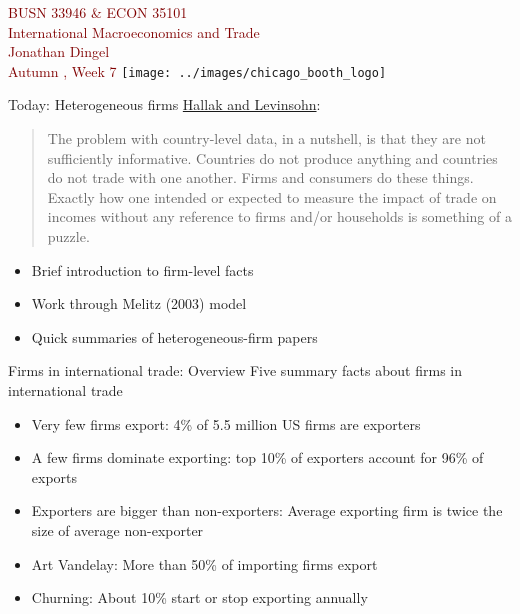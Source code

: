 \documentclass[10pt,notes=hide]{beamer}
\begin{document}
\begin{frame}[plain]
\begin{center}
\large
\textcolor{maroon}{BUSN 33946 \& ECON 35101\\
International Macroeconomics and Trade\\ 
Jonathan Dingel\\
Autumn \the\year, Week 7}
\vfill 
\texttt{[image: ../images/chicago\_booth\_logo]}
\end{center}
\end{frame}
\begin{frame}{Today: Heterogeneous firms}
\href{http://fordschool.umich.edu/rsie/workingpapers/Papers501-525/r509.pdf}{Hallak and Levinsohn}:
\begin{quote}
The problem with country-level data, in a nutshell, is that they are not sufficiently informative.
Countries do not produce anything and countries do not trade with one another.
Firms and consumers do these things.
Exactly how one intended or expected to measure the impact of trade on incomes without any reference to firms and/or households is something of a puzzle.
\end{quote}
\begin{itemize}
\item Brief introduction to firm-level facts
\item Work through Melitz (2003) model
\item Quick summaries of heterogeneous-firm papers
\end{itemize}
\end{frame}
\begin{frame}{Firms in international trade: Overview}
Five summary facts about firms in international trade
\begin{itemize}
\item Very few firms export:  4\% of 5.5 million US firms are exporters %
\item A few firms dominate exporting: top 10\% of exporters account for 96\% of exports  %
\item Exporters are bigger than non-exporters: Average exporting firm is twice the size of average non-exporter   %
\item Art Vandelay: More than 50\% of importing firms export  %
\item Churning: About 10\% start or stop exporting annually %
\end{itemize}
\end{frame}
\end{document}
